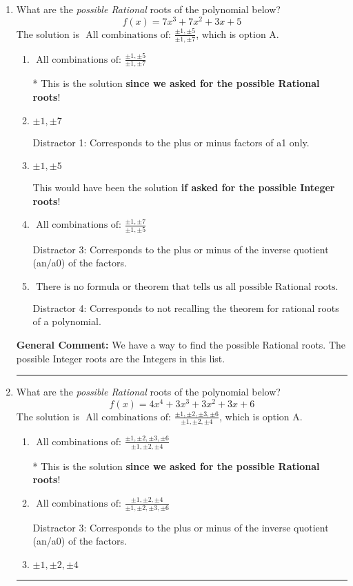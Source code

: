 \documentclass{extbook}[14pt]
\newcommand{\litem}[1]{\item #1

\rule{\textwidth}{0.4pt}}
\begin{document}
\begin{enumerate}\litem{
What are the \textit{possible Rational} roots of the polynomial below?
\[ f(x) = 7x^{3} +7 x^{2} +3 x + 5 \]The solution is \( \text{ All combinations of: }\frac{\pm 1,\pm 5}{\pm 1,\pm 7} \), which is option A.\begin{enumerate}[label=\Alph*.]
\item \( \text{ All combinations of: }\frac{\pm 1,\pm 5}{\pm 1,\pm 7} \)

* This is the solution \textbf{since we asked for the possible Rational roots}!
\item \( \pm 1,\pm 7 \)

 Distractor 1: Corresponds to the plus or minus factors of a1 only.
\item \( \pm 1,\pm 5 \)

This would have been the solution \textbf{if asked for the possible Integer roots}!
\item \( \text{ All combinations of: }\frac{\pm 1,\pm 7}{\pm 1,\pm 5} \)

 Distractor 3: Corresponds to the plus or minus of the inverse quotient (an/a0) of the factors. 
\item \( \text{ There is no formula or theorem that tells us all possible Rational roots.} \)

 Distractor 4: Corresponds to not recalling the theorem for rational roots of a polynomial.
\end{enumerate}

\textbf{General Comment:} We have a way to find the possible Rational roots. The possible Integer roots are the Integers in this list.
}
\litem{
What are the \textit{possible Rational} roots of the polynomial below?
\[ f(x) = 4x^{4} +3 x^{3} +3 x^{2} +3 x + 6 \]The solution is \( \text{ All combinations of: }\frac{\pm 1,\pm 2,\pm 3,\pm 6}{\pm 1,\pm 2,\pm 4} \), which is option A.\begin{enumerate}[label=\Alph*.]
\item \( \text{ All combinations of: }\frac{\pm 1,\pm 2,\pm 3,\pm 6}{\pm 1,\pm 2,\pm 4} \)

* This is the solution \textbf{since we asked for the possible Rational roots}!
\item \( \text{ All combinations of: }\frac{\pm 1,\pm 2,\pm 4}{\pm 1,\pm 2,\pm 3,\pm 6} \)

 Distractor 3: Corresponds to the plus or minus of the inverse quotient (an/a0) of the factors. 
\item \( \pm 1,\pm 2,\pm 4 \)


\end{enumerate}}
\end{enumerate}
\end{document}
